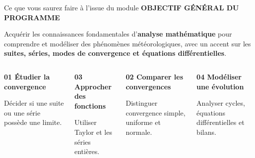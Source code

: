 \documentclass[aspectratio=169,10pt]{beamer}
\newcommand{\meta}[1]{{\small\bfseries\color{turquoise} #1}\par\vspace{0.07cm}}
\newcommand{\emphase}[1]{{\color{bleu}\bfseries #1}}
\begin{document}
\begin{frame}{Ce que vous saurez faire à l'issue du module}
\meta{OBJECTIF GÉNÉRAL DU PROGRAMME}
\begin{tcolorbox}[colback=pale,colframe=pale]
Acquérir les connaissances fondamentales d'\emphase{analyse mathématique} pour comprendre et modéliser des phénomènes météorologiques, avec un accent sur les \emphase{suites, séries, modes de convergence et équations différentielles}.
\end{tcolorbox}
\vspace{0.12cm}
\begin{columns}[T,onlytextwidth]
\begin{tcolorbox}[colback=palevert,colframe=palevert,height=1.24cm]
{\bfseries\color{turquoise}01 \quad Étudier la convergence}\par
\small Décider si une suite ou une série possède une limite.
\end{tcolorbox}
\begin{tcolorbox}[colback=pale,colframe=pale,height=1.24cm]
{\bfseries\color{bleu}03 \quad Approcher des fonctions}\par
\small Utiliser Taylor et les séries entières.
\end{tcolorbox}
\begin{tcolorbox}[colback=pale,colframe=pale,height=1.24cm]
{\bfseries\color{bleu}02 \quad Comparer les convergences}\par
\small Distinguer convergence simple, uniforme et normale.
\end{tcolorbox}
\begin{tcolorbox}[colback=palevert,colframe=palevert,height=1.24cm]
{\bfseries\color{turquoise}04 \quad Modéliser une évolution}\par
\small Analyser cycles, équations différentielles et bilans.
\end{tcolorbox}
\end{columns}
\end{frame}
\end{document}
